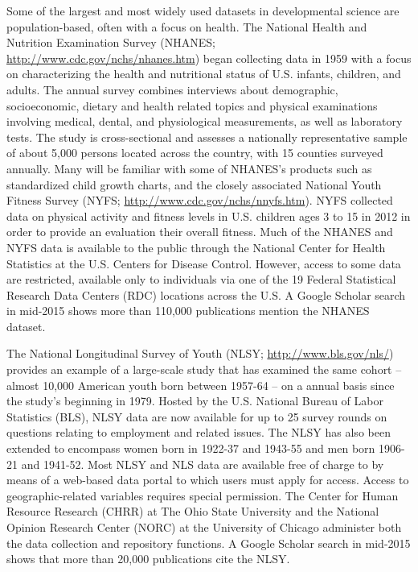 \documentclass[letterpaper,man,apacite]{apa6}
\begin{document}
Some of the largest and most widely used datasets in developmental science are population-based, often with a focus on health.
The National Health and Nutrition Examination Survey (NHANES; \url{http://www.cdc.gov/nchs/nhanes.htm}) began collecting data in 1959 with a focus on characterizing the health and nutritional status of U.S. infants, children, and adults. 
The annual survey combines interviews about demographic, socioeconomic, dietary and health related topics and physical examinations involving medical, dental, and physiological measurements, as well as laboratory tests.
The study is cross-sectional and assesses a nationally representative sample of about 5,000 persons located across the country, with 15 counties surveyed annually.
Many will be familiar with some of NHANES's products such as standardized child growth charts, and the closely associated National Youth Fitness Survey (NYFS; \url{http://www.cdc.gov/nchs/nnyfs.htm}).
NYFS collected data on physical activity and fitness levels in U.S. children ages 3 to 15 in 2012 in order to provide an evaluation their overall fitness.
Much of the NHANES and NYFS data is available to the public through the National Center for Health Statistics at the U.S. Centers for Disease Control.
However, access to some data are restricted, available only to individuals via one of the 19 Federal Statistical Research Data Centers (RDC) locations across the U.S.
A Google Scholar search in mid-2015 shows more than 110,000 publications mention the NHANES dataset.

The National Longitudinal Survey of Youth (NLSY; \url{http://www.bls.gov/nls/}) provides an example of a large-scale study that has examined the same cohort -- almost 10,000 American youth born between 1957-64 -- on a annual basis since the study's beginning in 1979.
Hosted by the U.S. National Bureau of Labor Statistics (BLS), NLSY data are now available for up to 25 survey rounds on questions relating to employment and related issues.
The NLSY has also been extended to encompass women born in 1922-37 and 1943-55 and men born 1906-21 and 1941-52.
Most NLSY and NLS data are available free of charge to by means of a web-based data portal to which users must apply for access.
Access to geographic-related variables requires special permission.
The Center for Human Resource Research (CHRR) at The Ohio State University and the National Opinion Research Center (NORC) at the University of Chicago administer both the data collection and repository functions.
A Google Scholar search in mid-2015 shows that more than 20,000 publications cite the NLSY.
\end{document}
